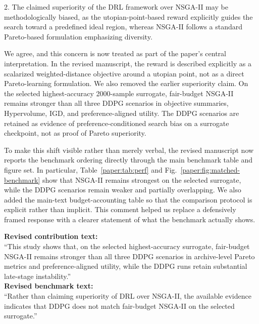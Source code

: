 \begin{ReviewerComment}
2. The claimed superiority of the DRL framework over NSGA-II may be methodologically biased, as the utopian-point-based reward explicitly guides the search toward a predefined ideal region, whereas NSGA-II follows a standard Pareto-based formulation emphasizing diversity.
\end{ReviewerComment}
%
\begin{Answer}
We agree, and this concern is now treated as part of the paper's central interpretation. In the revised manuscript, the reward is described explicitly as a scalarized weighted-distance objective around a utopian point, not as a direct Pareto-learning formulation. We also removed the earlier superiority claim. On the selected highest-accuracy 2000-sample surrogate, fair-budget NSGA-II remains stronger than all three DDPG scenarios in objective summaries, Hypervolume, IGD, and preference-aligned utility. The DDPG scenarios are retained as evidence of preference-conditioned search bias on a surrogate checkpoint, not as proof of Pareto superiority.

To make this shift visible rather than merely verbal, the revised manuscript now reports the benchmark ordering directly through the main benchmark table and figure set. In particular, Table~\ref{paper:tab:perf} and Fig.~\ref{paper:fig:matched-benchmark} show that NSGA-II remains strongest on the selected surrogate, while the DDPG scenarios remain weaker and partially overlapping. We also added the main-text budget-accounting table so that the comparison protocol is explicit rather than implicit. This comment helped us replace a defensively framed response with a clearer statement of what the benchmark actually shows.
\end{Answer}
\begin{RevisionExcerpt}
\noindent\textbf{Revised contribution text:}\\
``This study shows that, on the selected highest-accuracy surrogate, fair-budget NSGA-II remains stronger than all three DDPG scenarios in archive-level Pareto metrics and preference-aligned utility, while the DDPG runs retain substantial late-stage instability.''\\[0.5em]
\noindent\textbf{Revised benchmark text:}\\
``Rather than claiming superiority of DRL over NSGA-II, the available evidence indicates that DDPG does not match fair-budget NSGA-II on the selected surrogate.''
\end{RevisionExcerpt}
